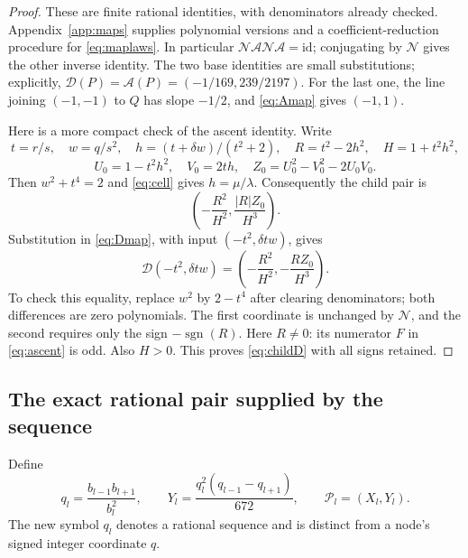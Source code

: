 \documentclass[11pt,a4paper]{article}
\theoremstyle{definition}
\newcommand{\pp}{\mathcal P}
\newcommand{\NN}{\mathcal N}
\renewcommand{\AA}{\mathcal A}
\newcommand{\DD}{\mathcal D}
\newcommand{\sgn}{\operatorname{sgn}}
\begin{document}
\begin{proof}
These are finite rational identities, with denominators already
checked. Appendix~\ref{app:maps} supplies polynomial versions and a
coefficient-reduction procedure for \eqref{eq:maplaws}. In particular
\(\NN\AA\NN\AA=\mathrm{id}\); conjugating by \(\NN\) gives the
other inverse identity. The two base identities are small substitutions;
explicitly, \(\DD(P)=\AA(P)=(-1/169,239/2197)\).
For the last one, the line joining \((-1,-1)\) to \(Q\) has slope
\(-1/2\), and \eqref{eq:Amap} gives \((-1,1)\).

Here is a more compact check of the ascent identity. Write
\[
 t=r/s,\quad w=q/s^2,\quad h=(t+\delta w)/(t^2+2),
 \quad R=t^2-2h^2,\quad H=1+t^2h^2,
\]
\[
 U_0=1-t^2h^2,\quad V_0=2th,\quad
 Z_0=U_0^2-V_0^2-2U_0V_0.
\]
Then \(w^2+t^4=2\) and \eqref{eq:cell} gives \(h=\mu/\lambda\).
Consequently the child pair is
\[
 \left(-\frac{R^2}{H^2},\frac{|R|Z_0}{H^3}\right).
\]
Substitution in \eqref{eq:Dmap}, with input
\((-t^2,\delta tw)\), gives
\begin{equation}\label{eq:ascent-map-check}
 \DD(-t^2,\delta tw)
   =\left(-\frac{R^2}{H^2},-\frac{RZ_0}{H^3}\right).
\end{equation}
To check this equality, replace \(w^2\) by \(2-t^4\) after clearing
denominators; both differences are zero polynomials. The first
coordinate is unchanged by \(\NN\), and the second requires only
the sign \(-\sgn(R)\). Here \(R\ne0\): its numerator
\(F\) in \eqref{eq:ascent} is odd. Also \(H>0\).
This proves \eqref{eq:childD} with all signs retained.
\end{proof}

\subsection{The exact rational pair supplied by the sequence}

Define
\begin{equation}\label{eq:q-and-point}
 q_l=\frac{b_{l-1}b_{l+1}}{b_l^2},\qquad
 Y_l=\frac{q_l^2(q_{l-1}-q_{l+1})}{672},\qquad
 \pp_l=(X_l,Y_l).
\end{equation}
The new symbol \(q_l\) denotes a rational sequence and is distinct
from a node's signed integer coordinate \(q\).
\end{document}
